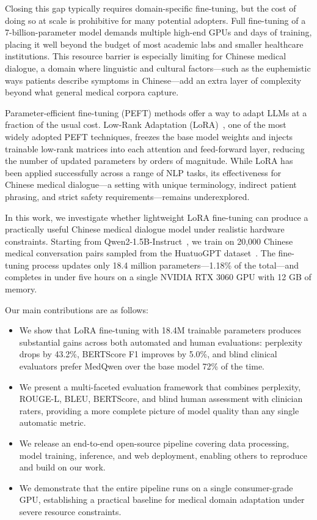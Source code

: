 \documentclass[11pt,a4paper]{article}
\begin{document}
Closing this gap typically requires domain-specific fine-tuning, but the cost of doing so at scale is prohibitive for many potential adopters. Full fine-tuning of a 7-billion-parameter model demands multiple high-end GPUs and days of training, placing it well beyond the budget of most academic labs and smaller healthcare institutions. This resource barrier is especially limiting for Chinese medical dialogue, a domain where linguistic and cultural factors---such as the euphemistic ways patients describe symptoms in Chinese---add an extra layer of complexity beyond what general medical corpora capture.

Parameter-efficient fine-tuning (PEFT) methods offer a way to adapt LLMs at a fraction of the usual cost. Low-Rank Adaptation (LoRA)~\cite{hu2021lora}, one of the most widely adopted PEFT techniques, freezes the base model weights and injects trainable low-rank matrices into each attention and feed-forward layer, reducing the number of updated parameters by orders of magnitude. While LoRA has been applied successfully across a range of NLP tasks, its effectiveness for Chinese medical dialogue---a setting with unique terminology, indirect patient phrasing, and strict safety requirements---remains underexplored.

In this work, we investigate whether lightweight LoRA fine-tuning can produce a practically useful Chinese medical dialogue model under realistic hardware constraints. Starting from Qwen2-1.5B-Instruct~\cite{yang2024qwen2}, we train on 20,000 Chinese medical conversation pairs sampled from the HuatuoGPT dataset~\cite{zhang2023huatuogpt}. The fine-tuning process updates only 18.4 million parameters---1.18\% of the total---and completes in under five hours on a single NVIDIA RTX 3060 GPU with 12 GB of memory.

Our main contributions are as follows:

\begin{itemize}
    \item We show that LoRA fine-tuning with 18.4M trainable parameters produces substantial gains across both automated and human evaluations: perplexity drops by 43.2\%, BERTScore F1 improves by 5.0\%, and blind clinical evaluators prefer MedQwen over the base model 72\% of the time.
    \item We present a multi-faceted evaluation framework that combines perplexity, ROUGE-L, BLEU, BERTScore, and blind human assessment with clinician raters, providing a more complete picture of model quality than any single automatic metric.
    \item We release an end-to-end open-source pipeline covering data processing, model training, inference, and web deployment, enabling others to reproduce and build on our work.
    \item We demonstrate that the entire pipeline runs on a single consumer-grade GPU, establishing a practical baseline for medical domain adaptation under severe resource constraints.
\end{itemize}
\end{document}
